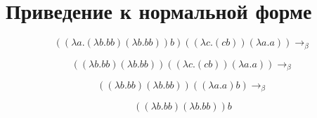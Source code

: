 \documentclass{article}
\begin{document}
\section{Приведение к нормальной форме}

\Large$$ ((\lambda a.(\lambda b. b b) (\lambda b. b b)) b) ((\lambda c.(c b)) (\lambda a.a)) \rightarrow_{\beta}$$ 

$$((\lambda b. b b) (\lambda b. b b)) ((\lambda c.(c b)) (\lambda a.a)) \rightarrow_{\beta}$$

$$ ((\lambda b. b b) (\lambda b. b b)) ((\lambda a.a) b) \rightarrow_{\beta}$$

$$ ((\lambda b. b b) (\lambda b. b b)) b$$
\end{document}
